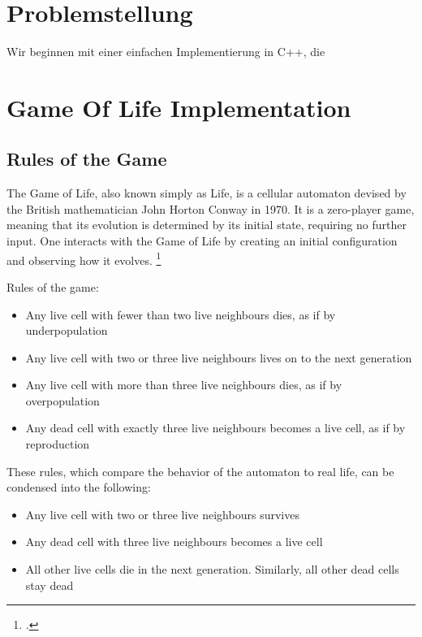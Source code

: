 \documentclass[a4paper,german,12pt,twoside=false]{scrartcl} %
\begin{document}
\pagebreak

\section{Problemstellung}

Wir beginnen mit einer einfachen Implementierung in C++, die 


\section{Game Of Life Implementation}

\subsection{Rules of the Game}

The Game of Life, also known simply as Life, is a cellular automaton devised by the British mathematician John Horton Conway in 1970. It is a zero-player game, meaning that its evolution is determined by its initial state, requiring no further input. One interacts with the Game of Life by creating an initial configuration and observing how it evolves. \footcite{placeholder}

\breakln

Rules of the game:

\begin{itemize}
	\item{Any live cell with fewer than two live neighbours dies, as if by underpopulation}
	\item{Any live cell with two or three live neighbours lives on to the next generation}
	\item{Any live cell with more than three live neighbours dies, as if by overpopulation}
	\item{Any dead cell with exactly three live neighbours becomes a live cell, as if by reproduction}
\end{itemize}

These rules, which compare the behavior of the automaton to real life, can be condensed into the following:

\begin{itemize}
	\item{Any live cell with two or three live neighbours survives}
	\item{Any dead cell with three live neighbours becomes a live cell}
	\item{All other live cells die in the next generation. Similarly, all other dead cells stay dead}
\end{itemize}
\end{document}
